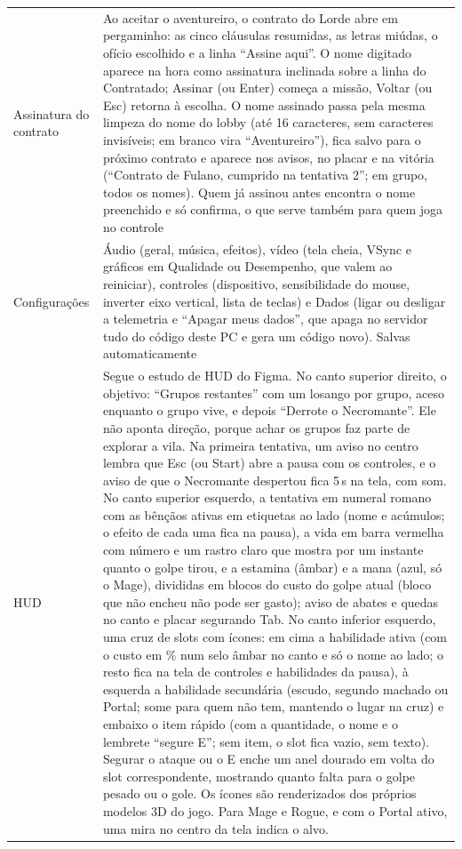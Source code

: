 \documentclass[11pt,a4paper]{article}
\begin{document}
\begin{xltabular}{\textwidth}{@{}lX@{}}
Assinatura do contrato & Ao aceitar o aventureiro, o contrato do Lorde abre em pergaminho: as cinco cláusulas resumidas, as letras miúdas, o ofício escolhido e a linha ``Assine aqui''. O nome digitado aparece na hora como assinatura inclinada sobre a linha do Contratado; Assinar (ou Enter) começa a missão, Voltar (ou Esc) retorna à escolha. O nome assinado passa pela mesma limpeza do nome do lobby (até 16 caracteres, sem caracteres invisíveis; em branco vira ``Aventureiro''), fica salvo para o próximo contrato e aparece nos avisos, no placar e na vitória (``Contrato de Fulano, cumprido na tentativa 2''; em grupo, todos os nomes). Quem já assinou antes encontra o nome preenchido e só confirma, o que serve também para quem joga no controle \\
Configurações & Áudio (geral, música, efeitos), vídeo (tela cheia, VSync e gráficos em Qualidade ou Desempenho, que valem ao reiniciar), controles (dispositivo, sensibilidade do mouse, inverter eixo vertical, lista de teclas) e Dados (ligar ou desligar a telemetria e ``Apagar meus dados'', que apaga no servidor tudo do código deste PC e gera um código novo). Salvas automaticamente \\
HUD & Segue o estudo de HUD do Figma. No canto superior direito, o objetivo: ``Grupos restantes'' com um losango por grupo, aceso enquanto o grupo vive, e depois ``Derrote o Necromante''. Ele não aponta direção, porque achar os grupos faz parte de explorar a vila. Na primeira tentativa, um aviso no centro lembra que Esc (ou Start) abre a pausa com os controles, e o aviso de que o Necromante despertou fica 5\,s na tela, com som. No canto superior esquerdo, a tentativa em numeral romano com as bênçãos ativas em etiquetas ao lado (nome e acúmulos; o efeito de cada uma fica na pausa), a vida em barra vermelha com número e um rastro claro que mostra por um instante quanto o golpe tirou, e a estamina (âmbar) e a mana (azul, só o Mage), divididas em blocos do custo do golpe atual (bloco que não encheu não pode ser gasto); aviso de abates e quedas no canto e placar segurando Tab. No canto inferior esquerdo, uma cruz de slots com ícones: em cima a habilidade ativa (com o custo em \% num selo âmbar no canto e só o nome ao lado; o resto fica na tela de controles e habilidades da pausa), à esquerda a habilidade secundária (escudo, segundo machado ou Portal; some para quem não tem, mantendo o lugar na cruz) e embaixo o item rápido (com a quantidade, o nome e o lembrete ``segure E''; sem item, o slot fica vazio, sem texto). Segurar o ataque ou o E enche um anel dourado em volta do slot correspondente, mostrando quanto falta para o golpe pesado ou o gole. Os ícones são renderizados dos próprios modelos 3D do jogo. Para Mage e Rogue, e com o Portal ativo, uma mira no centro da tela indica o alvo. \\

\end{xltabular}
\end{document}
